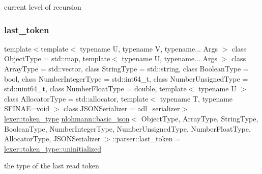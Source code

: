 current level of recursion 

\mbox{\label{classnlohmann_1_1basic__json_1_1parser_ace0babedd22742bbb5f31d35d1d5baa9}} 
\subsubsection{\texorpdfstring{last\+\_\+token}{last\_token}}
{\footnotesize\ttfamily template$<$template$<$ typename U, typename V, typename... Args $>$ class Object\+Type = std\+::map, template$<$ typename U, typename... Args $>$ class Array\+Type = std\+::vector, class String\+Type  = std\+::string, class Boolean\+Type  = bool, class Number\+Integer\+Type  = std\+::int64\+\_\+t, class Number\+Unsigned\+Type  = std\+::uint64\+\_\+t, class Number\+Float\+Type  = double, template$<$ typename U $>$ class Allocator\+Type = std\+::allocator, template$<$ typename T, typename S\+F\+I\+N\+A\+E=void $>$ class J\+S\+O\+N\+Serializer = adl\+\_\+serializer$>$ \\
\hyperlink{classnlohmann_1_1basic__json_1_1lexer_a96887d6cd131e3d3a85a9d71fbdbcdf7}{lexer\+::token\+\_\+type} \hyperlink{classnlohmann_1_1basic__json}{nlohmann\+::basic\+\_\+json}$<$ Object\+Type, Array\+Type, String\+Type, Boolean\+Type, Number\+Integer\+Type, Number\+Unsigned\+Type, Number\+Float\+Type, Allocator\+Type, J\+S\+O\+N\+Serializer $>$\+::parser\+::last\+\_\+token = \hyperlink{classnlohmann_1_1basic__json_1_1lexer_a96887d6cd131e3d3a85a9d71fbdbcdf7a42dd1a73d072bb6bf3f494f22b15db8e}{lexer\+::token\+\_\+type\+::uninitialized}\hspace{0.3cm}{\ttfamily [private]}}



the type of the last read token 

\mbox{\label{classnlohmann_1_1basic__json_1_1parser_a8419745c712b365ccf3d87abc7586e08}} 
